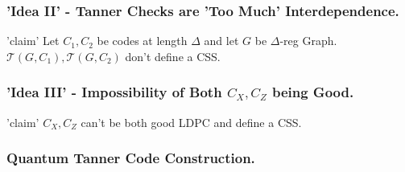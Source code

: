 \documentclass[usenames, aspectratio=169]{beamer}
\theoremstyle{claim}
\theoremstyle{remark}
\begin{document}
\begin{frame}
  \frametitle{ 'Idea II' - Tanner Checks are 'Too Much' Interdependence.}
  \begin{block}{'claim'}
    Let $C_{1}, C_{2}$ be codes at length $\Delta$ and let $G$ be $\Delta$-reg Graph. $\mathcal{T}\left(G, C_{1} \right),\mathcal{T}\left(G, C_{2} \right)$ don't define a CSS. 
  \end{block}
\end{frame}

\begin{frame}
  \frametitle{ 'Idea III' - Impossibility of Both $C_{X},C_{Z}$ being Good.}
  \begin{block}{'claim'}
    $C_{X},C_{Z}$ can't be both good LDPC and define a CSS.  
  \end{block}
\end{frame}

\begin{frame}
  \frametitle{ Quantum Tanner Code Construction.}

  \begin{block}{ }
  \end{block} 


\end{frame}
\end{document}

